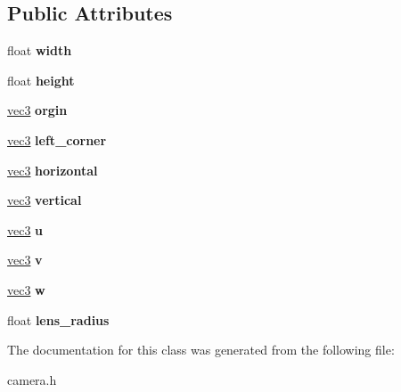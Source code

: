 \subsection*{Public Attributes}
\begin{DoxyCompactItemize}
\item 
\mbox{\label{classcamera_a69e10fd2cc480c82ab94764bdab76a10}} 
float {\bfseries width}
\item 
\mbox{\label{classcamera_a5b8898243a5c86b93420ebf7acf8e38e}} 
float {\bfseries height}
\item 
\mbox{\label{classcamera_a6972f535b7b21cb967d62b4711bfcd08}} 
\hyperlink{classvec3}{vec3} {\bfseries orgin}
\item 
\mbox{\label{classcamera_a4f33036cda2e0e4a85333ceebbad6344}} 
\hyperlink{classvec3}{vec3} {\bfseries left\+\_\+corner}
\item 
\mbox{\label{classcamera_a195d6ef80d6cd3d4ef6dbdf6333799d3}} 
\hyperlink{classvec3}{vec3} {\bfseries horizontal}
\item 
\mbox{\label{classcamera_a27c92c40ba0833359e87ecf095cc4d22}} 
\hyperlink{classvec3}{vec3} {\bfseries vertical}
\item 
\mbox{\label{classcamera_a610b4723a2dc8dbeefc815fe99116719}} 
\hyperlink{classvec3}{vec3} {\bfseries u}
\item 
\mbox{\label{classcamera_a056e047e57d62a35813f8c5d7bfa78cb}} 
\hyperlink{classvec3}{vec3} {\bfseries v}
\item 
\mbox{\label{classcamera_a67a4be1092662ed5b399a396ba61df50}} 
\hyperlink{classvec3}{vec3} {\bfseries w}
\item 
\mbox{\label{classcamera_a4ec3ef650f65d9575cc21c44117b6d4c}} 
float {\bfseries lens\+\_\+radius}
\end{DoxyCompactItemize}


The documentation for this class was generated from the following file\+:\begin{DoxyCompactItemize}
\item 
camera.\+h\end{DoxyCompactItemize}

